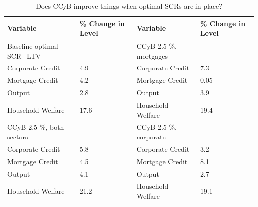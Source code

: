 \documentclass[12pt]{article}
\numberwithin{equation}{section}
\begin{document}
\begin{table}[h]
\caption{Does CCyB improve things when optimal SCRs are in place?}
\label{counterfactual3}
\begin{tabular}{ll||ll}
\small
Variable & \% Change in Level  & Variable & \% Change in Level \\
\hline
Baseline optimal SCR+LTV & &  CCyB 2.5 \%, mortgages   \\
\hline
    Corporate Credit           &       4.9  &    Corporate Credit           &       7.3   \\
    Mortgage Credit            &      4.2 & Mortgage Credit            &       0.05\\
    Output         &     2.8   &  Output         				&     3.9  \\
    Household Welfare       &     17.6 &   Household Welfare       &        19.4  \\
\hline
CCyB 2.5 \%, both sectors &   &   CCyB 2.5 \%, corporate  \\
\hline
    Corporate Credit           &       5.8  &  Corporate Credit           &       3.2 \\
    Mortgage Credit            &       4.5  &    Mortgage Credit            &       8.1  \\
    Output         				&     4.1  &  Output         				&      2.7  \\
    Household Welfare       &        21.2  &  Household Welfare       &          19.1  \\
\hline

\end{tabular}
\end{table}
\end{document}
